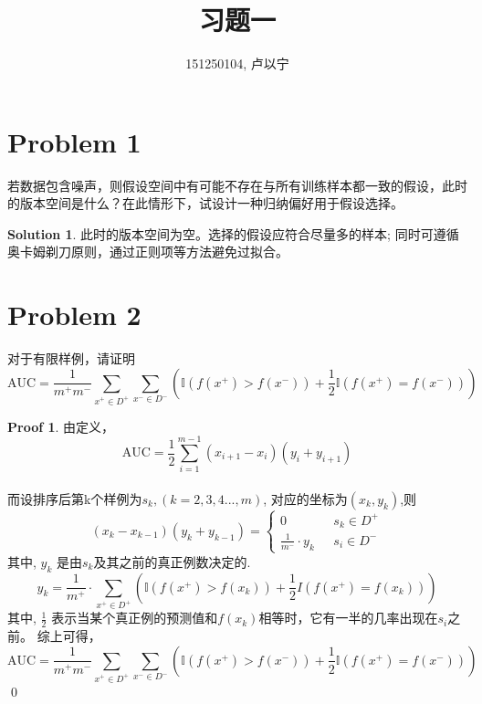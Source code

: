 \documentclass[a4paper,UTF8]{article}
\theoremstyle{definition}
\newtheorem*{solution}{Solution}
\newtheorem*{prove}{Proof}
\begin{document}
\title{习题一}
\author{151250104, 卢以宁}
\maketitle


\section*{Problem 1}
若数据包含噪声，则假设空间中有可能不存在与所有训练样本都一致的假设，此时的版本空间是什么？在此情形下，试设计一种归纳偏好用于假设选择。

\begin{solution}
 此时的版本空间为空。选择的假设应符合尽量多的样本; 同时可遵循奥卡姆剃刀原则，通过正则项等方法避免过拟合。
\end{solution}

\section*{Problem 2}
对于有限样例，请证明
\[
\text{AUC} = \frac{1}{m^+m^-}\sum_{x^+\in D^+}\sum_{x^-\in D^-}\left(\mathbb{I}(f(x^+)>f(x^-))+\frac{1}{2}\mathbb{I}(f(x^+)=f(x^-))\right)
\]

\begin{prove}
由定义，\[ \text{AUC} =  \frac{1}{2} \sum^{m-1}_{i=1}(x_{i+1}-x_{i})(y_i+y_{i+1}) \] \\
而设排序后第k个样例为$s_k, (k = 2, 3, 4..., m)$, 对应的坐标为$(x_{k},y_{k})$,则
\begin{displaymath}
(x_{k}-x_{k-1})(y_k+y_{k-1}) = \left\{ \begin{array}{ll}
 0 & \textrm{ $s_k\in D^+$}\\
\frac{1}{m^-}\cdot y_k & \textrm{ $s_i\in D^-$}
  \end{array} \right.
\end{displaymath}
其中, $y_k$ 是由$s_k$及其之前的真正例数决定的. 
\[
y_k = \frac{1}{m^+}\cdot \sum_{x^+ \in D^+} \left( \mathbb{I} \left( f(x^+)>f(x_k) \right)  +  \frac{1}{2} {I}\left(f(x^+)=f(x_k)\right) \right)
\]
其中, $\frac{1}{2}$ 表示当某个真正例的预测值和$f(x_k)$相等时，它有一半的几率出现在$s_i$之前。
综上可得，
\[
\text{AUC} = \frac{1}{m^+m^-}\sum_{x^+\in D^+}\sum_{x^-\in D^-}\left(\mathbb{I}(f(x^+)>f(x^-))+\frac{1}{2}\mathbb{I}(f(x^+)=f(x^-))\right)
\]
\qed
\end{prove}
\end{document}

